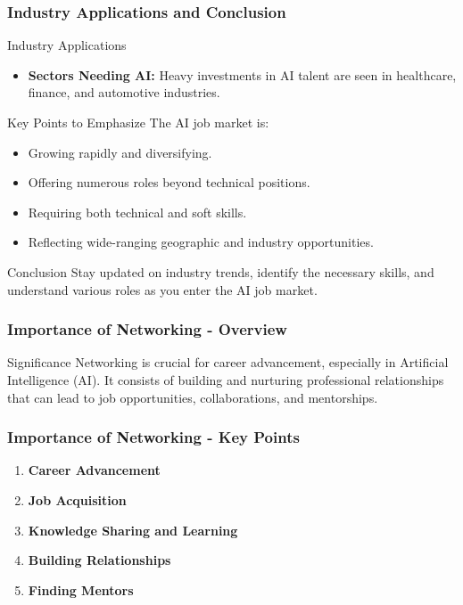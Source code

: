 \documentclass{beamer}
\begin{document}
\begin{frame}[fragile]
    \frametitle{Industry Applications and Conclusion}
    
    \begin{block}{Industry Applications}
        \begin{itemize}
            \item \textbf{Sectors Needing AI:} 
                Heavy investments in AI talent are seen in healthcare, finance, and automotive industries.
        \end{itemize}
    \end{block}
    
    \begin{block}{Key Points to Emphasize}
        The AI job market is:
        \begin{itemize}
            \item Growing rapidly and diversifying.
            \item Offering numerous roles beyond technical positions.
            \item Requiring both technical and soft skills.
            \item Reflecting wide-ranging geographic and industry opportunities.
        \end{itemize}
    \end{block}
    
    \begin{block}{Conclusion}
        Stay updated on industry trends, identify the necessary skills, and understand various roles as you enter the AI job market.
    \end{block}
\end{frame}

\begin{frame}[fragile]
    \frametitle{Importance of Networking - Overview}
    \begin{block}{Significance}
        Networking is crucial for career advancement, especially in Artificial Intelligence (AI). It consists of building and nurturing professional relationships that can lead to job opportunities, collaborations, and mentorships.
    \end{block}
\end{frame}

\begin{frame}[fragile]
    \frametitle{Importance of Networking - Key Points}
    \begin{enumerate}
        \item \textbf{Career Advancement}
        \item \textbf{Job Acquisition}
        \item \textbf{Knowledge Sharing and Learning}
        \item \textbf{Building Relationships}
        \item \textbf{Finding Mentors}
    \end{enumerate}
\end{frame}
\end{document}
